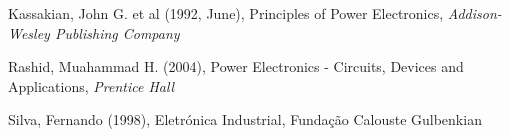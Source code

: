 \documentclass[a4paper,11pt]{article}
\numberwithin{equation}{section}
\begin{document}
\pagebreak

\begin{thebibliography}{2}
	
	Kassakian, John G. et al (1992, June), Principles of Power Electronics, \textit{Addison-Wesley Publishing Company}

	Rashid, Muahammad H. (2004), Power Electronics - Circuits, Devices and Applications, \textit{Prentice Hall}
	
	Silva, Fernando (1998), Eletrónica Industrial, Fundação Calouste Gulbenkian
	
\end{thebibliography}


\pagebreak
\end{document}

